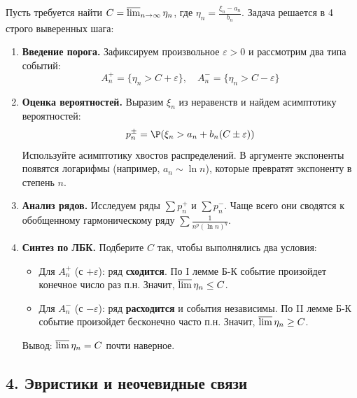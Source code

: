\begin{MethodBox}
Пусть требуется найти $C = \varlimsup_{n\to\infty} \eta_n$, где $\eta_n = \frac{\xi_n - a_n}{b_n}$. 
Задача решается в 4 строго выверенных шага:

\begin{enumerate}[label=\textbf{\arabic*.}]
    \item \textbf{Введение порога.} Зафиксируем произвольное $\varepsilon > 0$ и рассмотрим два типа событий:
    \[ 
        A_n^+ = \{ \eta_n > C + \varepsilon \}, \quad A_n^- = \{ \eta_n > C - \varepsilon \} 
    \]
    
    \item \textbf{Оценка вероятностей.} Выразим $\xi_n$ из неравенств и найдем асимптотику вероятностей:
    \[ 
        p_n^{\pm} = \P(\xi_n > a_n + b_n(C \pm \varepsilon)) 
    \]
    Используйте асимптотику хвостов распределений. В аргументе экспоненты появятся логарифмы (например, $a_n \sim \ln n$), которые превратят экспоненту в степень $n$.
    
    \item \textbf{Анализ рядов.} Исследуем ряды $\sum p_n^+$ и $\sum p_n^-$. Чаще всего они сводятся к обобщенному гармоническому ряду $\sum \frac{1}{n^p (\ln n)^q}$.
    
    \item \textbf{Синтез по ЛБК.} Подберите $C$ так, чтобы выполнялись два условия:
    \begin{itemize}
        \item Для $A_n^+$ (с $+\varepsilon$): ряд \textbf{сходится}. По I лемме Б-К событие произойдет конечное число раз п.н. Значит, $\varlimsup \eta_n \le C$.
        \item Для $A_n^-$ (с $-\varepsilon$): ряд \textbf{расходится} и события независимы. По II лемме Б-К событие произойдет бесконечно часто п.н. Значит, $\varlimsup \eta_n \ge C$.
    \end{itemize}
    Вывод: $\varlimsup \eta_n = C$ почти наверное.
\end{enumerate}
\end{MethodBox}

\vspace{1em}

\subsection*{4. Эвристики и неочевидные связи}

